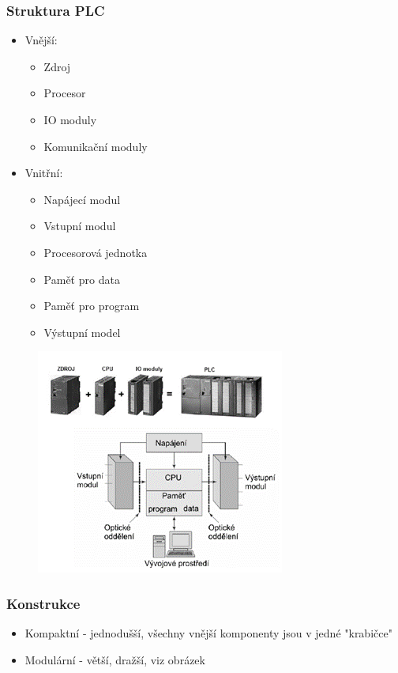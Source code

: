 \subsubsection*{Struktura PLC}
\begin{itemize}
    \item Vnější: \begin{itemize}
              \item Zdroj
              \item Procesor
              \item IO moduly
              \item Komunikační moduly
          \end{itemize}
    \item Vnitřní: \begin{itemize}
              \item Napájecí modul
              \item Vstupní modul
              \item Procesorová jednotka
              \item Paměť pro data
              \item Paměť pro program
              \item Výstupní model
          \end{itemize}
\end{itemize}

\begin{figure}[h]
    \begin{center}
        \includegraphics[scale = 1]{img/Picture13.png}
    \end{center}
\end{figure}

\subsubsection*{Konstrukce}
\begin{itemize}
    \item Kompaktní - jednodušší, všechny vnější komponenty jsou v jedné "krabičce"
    \item Modulární - větší, dražší, viz obrázek
\end{itemize}

